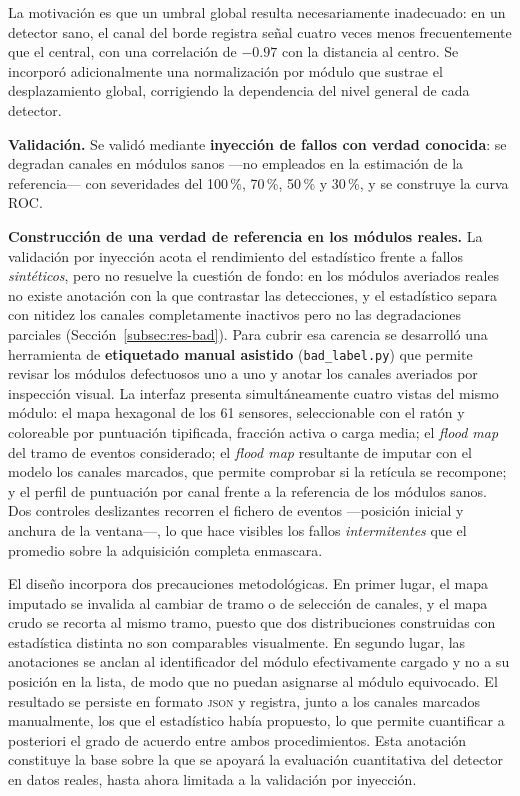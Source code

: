 La motivación es que un umbral global resulta necesariamente inadecuado: en un detector sano, el
canal del borde registra señal cuatro veces menos frecuentemente que el central, con una correlación
de $-0.97$ con la distancia al centro. Se incorporó adicionalmente una normalización por módulo
que sustrae el desplazamiento global, corrigiendo la dependencia del nivel general de cada detector.

\textbf{Validación.} Se validó mediante \textbf{inyección de fallos con verdad conocida}: se degradan
canales en módulos sanos ---no empleados en la estimación de la referencia--- con severidades del
100\,\%, 70\,\%, 50\,\% y 30\,\%, y se construye la curva ROC.

\textbf{Construcción de una verdad de referencia en los módulos reales.} La validación por inyección
acota el rendimiento del estadístico frente a fallos \emph{sintéticos}, pero no resuelve la cuestión
de fondo: en los módulos averiados reales no existe anotación con la que contrastar las detecciones,
y el estadístico separa con nitidez los canales completamente inactivos pero no las degradaciones
parciales (Sección~\ref{subsec:res-bad}). Para cubrir esa carencia se desarrolló una herramienta de
\textbf{etiquetado manual asistido} (\texttt{bad\_label.py}) que permite revisar los módulos
defectuosos uno a uno y anotar los canales averiados por inspección visual. La interfaz presenta
simultáneamente cuatro vistas del mismo módulo: el mapa hexagonal de los 61 sensores, seleccionable
con el ratón y coloreable por puntuación tipificada, fracción activa o carga media; el \emph{flood
map} del tramo de eventos considerado; el \emph{flood map} resultante de imputar con el modelo los
canales marcados, que permite comprobar si la retícula se recompone; y el perfil de puntuación por
canal frente a la referencia de los módulos sanos. Dos controles deslizantes recorren el fichero de
eventos ---posición inicial y anchura de la ventana---, lo que hace visibles los fallos
\emph{intermitentes} que el promedio sobre la adquisición completa enmascara.

El diseño incorpora dos precauciones metodológicas. En primer lugar, el mapa imputado se invalida al
cambiar de tramo o de selección de canales, y el mapa crudo se recorta al mismo tramo, puesto que
dos distribuciones construidas con estadística distinta no son comparables visualmente. En segundo
lugar, las anotaciones se anclan al identificador del módulo efectivamente cargado y no a su
posición en la lista, de modo que no puedan asignarse al módulo equivocado. El resultado se persiste
en formato \textsc{json} y registra, junto a los canales marcados manualmente, los que el
estadístico había propuesto, lo que permite cuantificar a posteriori el grado de acuerdo entre
ambos procedimientos. Esta anotación constituye la base sobre la que se apoyará la evaluación
cuantitativa del detector en datos reales, hasta ahora limitada a la validación por inyección.


